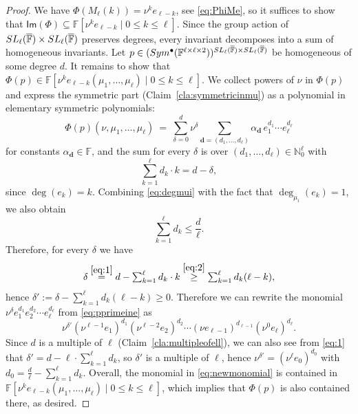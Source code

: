 \documentclass[10pt,a4paper]{amsart}
\newcommand{\IF}{\mathbb{F}}
\newcommand{\IN}{\mathbb{N}}
\newcommand{\SL}{\textsf{\textup{SL}}}
\newcommand{\Sym}{\textup{Sym}}
\newcommand{\oIF}{{\overline{\mathbb{F}}}}
\renewcommand{\Im}{\mathsf{Im}}
\begin{document}
\begin{proof}
We have
$\Phi(M_\ell(k)) = \nu^k e_{\ell-k}$, see \eqref{eq:PhiMe}, so it suffices to show that
$\Im(\Phi) \subseteq \IF\left[\nu^k e_{\ell-k}\mid 0\leq k \leq \ell\right]$.
Since the group action of $\SL_\ell(\oIF)\times \SL_\ell(\oIF)$ preserves degrees, every invariant decomposes into a sum of homogeneous invariants.
Let $p \in (\Sym^{\bullet}(\IF^{\ell\times\ell\times 2}))^{\SL_\ell(\oIF)\times \SL_\ell(\oIF)}$
be homogeneous of some degree $d$.
It remains to show that $\Phi(p) \in \IF\left[\nu^k e_{\ell-k}(\mu_1,\dots,\mu_\ell)\mid 0\leq k \leq \ell\right]$.
We collect powers of $\nu$ in $\Phi(p)$ and express the symmetric part (Claim~\ref{cla:symmetricinmu}) as a polynomial in elementary symmetric polynomials:
\begin{equation}
\label{eq:pprimeine}
\Phi(p)(\nu,\mu_1,\dots,\mu_\ell)
 \ = \ 
\sum_{\delta=0}^{d} \nu^\delta \sum_{\mathbf{d}=(d_1,\ldots,d_\ell)} \alpha_{\mathbf{d}} \, e_1^{d_1} \cdots e_\ell^{d_\ell}
\end{equation}
for constants $\alpha_{\mathbf{d}}\in \IF$,
and the sum for every $\delta$ is over
$(d_1,\ldots,d_\ell) \in \IN_0^\ell$ with
\begin{equation}
\label{eq:1}
\textstyle
\sum_{k=1}^\ell d_k \cdot k = d-\delta,
\end{equation}
since $\deg (e_k)=k$.
Combining \eqref{eq:degmui} with the fact that $\deg_{\mu_i}(e_k) = 1$, we also obtain
\begin{equation}
\label{eq:2}
\textstyle
\sum_{k=1}^\ell d_k \leq \frac{d}{\ell}.
\end{equation}
Therefore, for every $\delta$ we have
\[\textstyle
\delta
\stackrel{\eqref{eq:1}}{=}
d - \sum_{k=1}^\ell d_k \cdot k
\stackrel{\eqref{eq:2}}{\geq}
\sum_{k=1}^\ell d_k (\ell-k),
\]
hence $\delta' := \delta-\sum_{k=1}^\ell d_k (\ell-k) \geq 0$.
Therefore we can rewrite the monomial $\nu^\delta e_1^{d_1}e_2^{d_2}\cdots e_\ell^{d_\ell}$
from \eqref{eq:pprimeine}
as
\begin{equation}
\label{eq:newmonomial}
\nu^{\delta'} (\nu^{\ell-1}e_1)^{d_1}(\nu^{\ell-2}e_2)^{d_2}\cdots (\nu e_{\ell-1})^{d_{\ell-1}} (\nu^0 e_\ell)^{d_\ell}.
\end{equation}
Since $d$ is a multiple of $\ell$ (Claim~\ref{cla:multipleofell}),
we can also see from \eqref{eq:1} that $\delta'= d - \ell\cdot \sum_{k=1}^\ell d_k$, so $\delta'$ is a multiple of $\ell$,
hence $\nu^{\delta'} = (\nu^\ell e_0)^{d_0}$ with $d_0 = \frac{d}{\ell}-\sum_{k=1}^\ell d_k$.
Overall, the monomial in \eqref{eq:newmonomial} is contained in $\IF\left[\nu^k e_{\ell-k}(\mu_1,\dots,\mu_\ell)\mid 0\leq k \leq \ell\right]$, which implies that $\Phi(p)$ is also contained there, as desired.
\end{proof}
\end{document}
